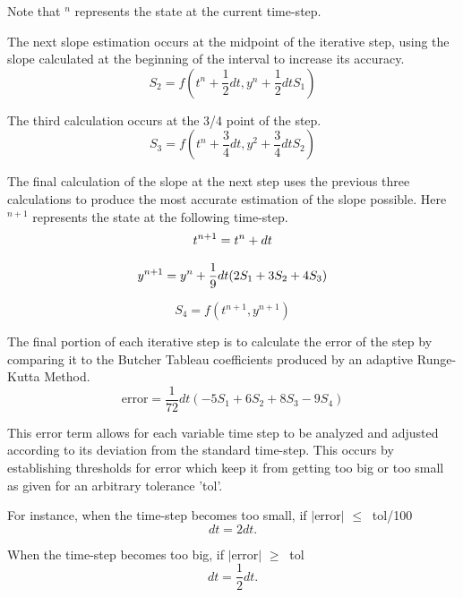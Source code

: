 \documentclass[letterpaper, twoside]{article}
\numberwithin{equation}{section}
\begin{document}
Note that $^n$ represents the state at the current time-step.

The next slope estimation occurs at the midpoint of the iterative step, using the slope calculated at the beginning of the interval to increase its accuracy.
\begin{equation} \label{eq: S_2}
  S_2 = f(t^n + \frac{1}{2} dt,y^n + \frac{1}{2} dt S_1)
\end{equation}

The third calculation occurs at the 3/4  point of the step.
\begin{equation} \label{eq: S_3}
  S_3 = f(t^n + \frac{3}{4} dt,y^2+\frac{3}{4} dt S_2)
\end{equation}

The final calculation of the slope at the next step uses the previous three calculations to produce the most accurate estimation of the slope possible. Here $^{n+1}$ represents the state at the following time-step.
\begin{equation} \label{eq: t_{new}}
  t^{n+1} = t^n + dt
\end{equation}

\begin{equation} \label{eq: y_{new}}
  y^{n+1} = y^n + \frac{1}{9} dt (2 S_1 + 3 S_2 + 4 S_3)
\end{equation}

\begin{equation} \label{eq: S_4}
  S_4 = f(t^{n+1},y^{n+1})
\end{equation}

The final portion of each iterative step is to calculate the error of the step by comparing it to the Butcher Tableau coefficients produced by an adaptive Runge-Kutta Method.
\begin{equation} \label{eq: errorfunction}
  \mathrm{error} = \frac{1}{72} dt (-5 S_1 + 6 S_2 + 8 S_3 - 9 S_4)
\end{equation}

This error term allows for each variable time step to be analyzed and adjusted according to its deviation from the standard time-step. This occurs by establishing thresholds for error which keep it from getting too big or too small as given for an arbitrary tolerance 'tol'.

For instance, when the time-step becomes too small, if $|$error$|$ $ \leq\ $ tol/100
\begin{equation}
  dt = 2 dt.
\end{equation}

When the time-step becomes too big, if $|$error$|$ $ \geq\ $ tol
\begin{equation}
  dt = \frac{1}{2} dt.
\end{equation}
\end{document}
